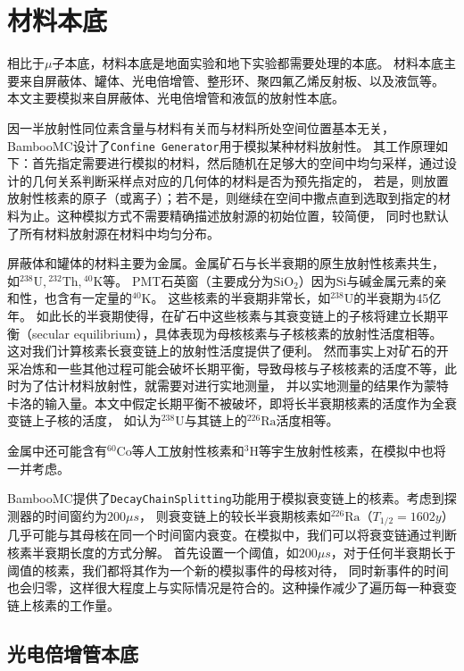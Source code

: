 \section{材料本底}

相比于$\mu$子本底，材料本底是地面实验和地下实验都需要处理的本底。
材料本底主要来自屏蔽体、罐体、光电倍增管、整形环、聚四氟乙烯反射板、以及液氙等。
本文主要模拟来自屏蔽体、光电倍增管和液氙的放射性本底。

因一半放射性同位素含量与材料有关而与材料所处空间位置基本无关，BambooMC设计了\verb|Confine Generator|用于模拟某种材料放射性。
其工作原理如下：首先指定需要进行模拟的材料，然后随机在足够大的空间中均匀采样，通过设计的几何关系判断采样点对应的几何体的材料是否为预先指定的，
若是，则放置放射性核素的原子（或离子）；若不是，则继续在空间中撒点直到选取到指定的材料为止。这种模拟方式不需要精确描述放射源的初始位置，较简便，
同时也默认了所有材料放射源在材料中均匀分布。

屏蔽体和罐体的材料主要为金属。金属矿石与长半衰期的原生放射性核素共生，
如${}^{238}\mathrm{U},{}^{232}\mathrm{Th},{}^{40}\mathrm{K}$等。
PMT石英窗（主要成分为$\mathrm{Si}\mathrm{O}_2$）因为$\mathrm{Si}$与碱金属元素的亲和性，也含有一定量的${}^{40}\mathrm{K}$。
这些核素的半衰期非常长，如${}^{238}\mathrm{U}$的半衰期为45亿年。
如此长的半衰期使得，在矿石中这些核素与其衰变链上的子核将建立长期平衡（secular equilibrium），具体表现为母核核素与子核核素的放射性活度相等。
这对我们计算核素长衰变链上的放射性活度提供了便利。
然而事实上对矿石的开采冶炼和一些其他过程可能会破坏长期平衡，导致母核与子核核素的活度不等，此时为了估计材料放射性，就需要对进行实地测量，
并以实地测量的结果作为蒙特卡洛的输入量。本文中假定长期平衡不被破坏，即将长半衰期核素的活度作为全衰变链上子核的活度，
如认为${}^{238}\mathrm{U}$与其链上的${}^{226}\mathrm{Ra}$活度相等。

金属中还可能含有${}^{60}\mathrm{Co}$等人工放射性核素和${}^{3}\mathrm{H}$等宇生放射性核素，在模拟中也将一并考虑。

BambooMC提供了\verb|DecayChainSplitting|功能用于模拟衰变链上的核素。考虑到探测器的时间窗约为$200\mu s$，
则衰变链上的较长半衰期核素如${}^{226}\mathrm{Ra}$（$T_{1/2}=1602y$）几乎可能与其母核在同一个时间窗内衰变。在模拟中，我们可以将衰变链通过判断核素半衰期长度的方式分解。
首先设置一个阈值，如$200\mu s$，对于任何半衰期长于阈值的核素，我们都将其作为一个新的模拟事件的母核对待，
同时新事件的时间也会归零，这样很大程度上与实际情况是符合的。这种操作减少了遍历每一种衰变链上核素的工作量。

\subsection{光电倍增管本底}
\label{sec:pmt_background}

